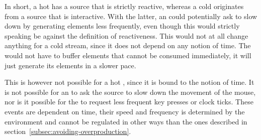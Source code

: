 In short, a hot \obs has a source that is strictly reactive, whereas a cold \obs originates from a source that is interactive. With the latter, an \obv could potentially ask to slow down by generating elements less frequently, even though this would strictly speaking be against the definition of reactiveness. This would not at all change anything for a cold stream, since it does not depend on any notion of time. The \obs would not have to buffer elements that cannot be consumed immediately, it will just generate its elements in a slower pace.

This is however not possible for a hot \obs, since it is bound to the notion of time. It is not possible for an \obv to ask the source to slow down the movement of the mouse, nor is it possible for the \obv to request less frequent key presses or clock ticks. These events are dependent on time, their speed and frequency is determined by the environment \cite{berry1991-Reactive} and cannot be regulated in other ways than the ones described in section~\ref{subsec:avoiding-overproduction}.